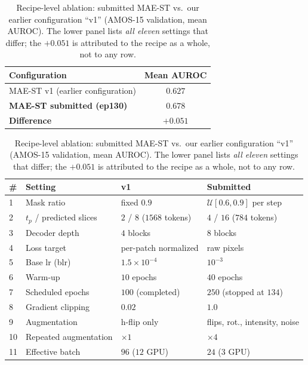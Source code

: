 \documentclass[runningheads]{llncs}
\begin{document}
\begin{table}[htbp]
\caption{Recipe-level ablation: submitted MAE-ST vs.\ our earlier configuration
``v1'' (AMOS-15 validation, mean AUROC). The lower panel lists \emph{all eleven}
settings that differ; the $+0.051$ is attributed to the recipe as a whole, not to
any row.}\label{tab:ablation}
\centering
\begin{tabular}{lc}
\hline
Configuration & Mean AUROC \\ \hline
MAE-ST v1 (earlier configuration)   & $0.627$ \\
\textbf{MAE-ST submitted (ep130)}   & $\mathbf{0.678}$ \\
\textbf{Difference}                 & $\mathbf{+0.051}$ \\ \hline
\end{tabular}

\vspace{1.2ex}
\begin{tabular}{llll}
\hline
\# & Setting & v1 & Submitted \\ \hline
1  & Mask ratio            & fixed $0.9$              & $\mathcal{U}[0.6,0.9]$ per step \\
2  & $t_p$ / predicted slices & $2$ / $8$ ($1568$ tokens) & $4$ / $16$ ($784$ tokens) \\
3  & Decoder depth         & $4$ blocks               & $8$ blocks \\
4  & Loss target           & per-patch normalized     & raw pixels \\
5  & Base lr (blr)         & $1.5{\times}10^{-4}$     & $10^{-3}$ \\
6  & Warm-up               & $10$ epochs              & $40$ epochs \\
7  & Scheduled epochs      & $100$ (completed)        & $250$ (stopped at $134$) \\
8  & Gradient clipping     & $0.02$                   & $1.0$ \\
9  & Augmentation          & h-flip only              & flips, rot., intensity, noise \\
10 & Repeated augmentation & $\times1$               & $\times4$ \\
11 & Effective batch       & $96$ ($12$ GPU)          & $24$ ($3$ GPU) \\ \hline
\end{tabular}
\end{table}
\end{document}
